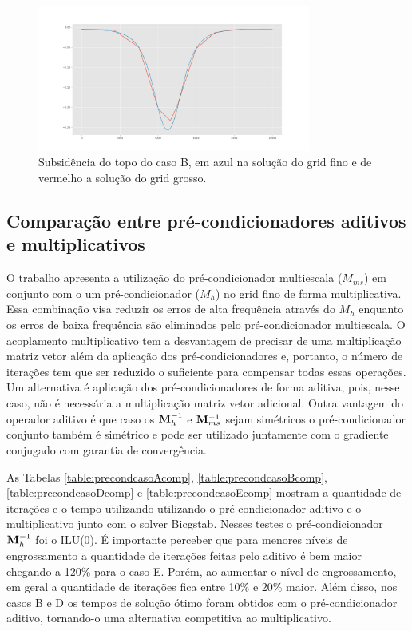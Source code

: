 \begin{figure}[!htbp]
\centering
\includegraphics[width=0.8\textwidth]{chap08/figs/Reservoir320x320_10x10_subsidence_multiscale.png}
\caption{Subsidência do topo do caso B, em azul na solução do grid fino e de vermelho a solução do grid grosso. }
\label{fig:subsidence} 
\end{figure}


\subsection{Comparação entre pré-condicionadores aditivos e multiplicativos}

O trabalho \cite{casteletto} apresenta a utilização do pré-condicionador multiescala ($M_{ms}$) em conjunto com o um pré-condicionador ($M_h$) no grid fino de forma multiplicativa. 
Essa combinação visa reduzir os erros de alta frequência através do $M_h$ enquanto os erros de baixa frequência são eliminados pelo pré-condicionador multiescala. 
O acoplamento multiplicativo tem a desvantagem de precisar de uma multiplicação matriz vetor além da aplicação dos pré-condicionadores
e, portanto, o número de iterações tem que ser reduzido o suficiente para compensar todas essas operações. Um alternativa é aplicação
dos pré-condicionadores de forma aditiva, pois, nesse caso, não é necessária a multiplicação matriz vetor adicional. Outra vantagem do operador aditivo é que caso os $\mathbf{M}^{-1}_{h}$ e $\mathbf{M}^{-1}_{ms}$ sejam simétricos o pré-condicionador conjunto também é simétrico e pode ser utilizado juntamente com o gradiente conjugado com garantia de convergência.


As Tabelas \ref{table:precondcasoAcomp}, \ref{table:precondcasoBcomp}, \ref{table:precondcasoDcomp} e \ref{table:precondcasoEcomp} mostram a quantidade de iterações e o tempo utilizando utilizando o pré-condicionador aditivo e o multiplicativo junto com o solver Bicgstab. Nesses testes o pré-condicionador $\mathbf{M}^{-1}_{h}$ foi o ILU(0). É importante perceber que para menores níveis de engrossamento a quantidade de iterações feitas pelo aditivo é bem maior chegando a 120\% para o caso E. Porém, ao aumentar o nível de engrossamento, em geral a quantidade de iterações fica entre 10\% e 20\% maior. Além disso, nos casos B e D os tempos de solução ótimo foram obtidos com o pré-condicionador aditivo, tornando-o uma alternativa competitiva ao multiplicativo.

